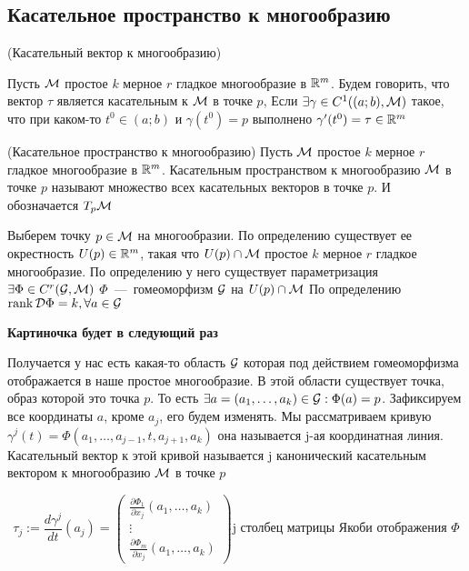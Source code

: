 
\subsection{Касательное пространство к многообразию}

\begin{definition} (Касательный вектор к многообразию)

Пусть $\mathcal{M}$ простое $k$ мерное $r$ гладкое многообразие в $\mathbb{R}^{m}$. Будем говорить, что вектор $\tau$ является касательным к $\mathcal{M}$ в точке $p$, Если $\exists \gamma \in C^{1} ((a;b), \mathcal{M})$ такое, что при каком-то $t^{0} \in (a; b)$ и $\gamma(t^{0}) = p$
выполнено $\gamma' (t^0) = \tau \in \mathbb{R}^m$ 


\end{definition}
    
    
\begin{definition} (Касательное пространство к многообразию)
    Пусть $\mathcal{M}$ простое $k$ мерное $r$ гладкое многообразие в $\mathbb{R}^{m}$. Касательным пространством к многообразию $\mathcal{M}$ в точке $p$ называют множество всех касательных векторов в точке $p$. И обозначается $T_{p} \mathcal{M}$
    
  
\end{definition}  
    
    

Выберем точку $p \in \mathcal{M}$ на многообразии. По определению существует ее окрестность $U(p) \in \mathbb{R}^{m}$, такая что $U(p) \cap \mathcal{M}$  простое $k$ мерное $r$ гладкое многообразие. По определению у него существует параметризация $\exists \Phi \in C^{r} (\mathcal{G}, \mathcal{M})$ $\Phi$~---~гомеоморфизм $\mathcal{G}$ на $U(p) \cap \mathcal{M}$ По определению $\operatorname{rank} \mathcal{D} \Phi = k, \forall a \in \mathcal{G}$


\textbf{Картиночка будет в следующий раз}

Получается у нас есть какая-то область $\mathcal{G}$ которая под действием гомеоморфизма отображается в наше простое многообразие. В этой области существует точка, образ которой это точка $p$. То есть 	$\exists a = (a_1, \dots , a_k) \in \mathcal{G}: \Phi(a) = p$.
Зафиксируем все координаты $a$, кроме $a_j$, его будем изменять. Мы рассматриваем кривую $\gamma^{j}(t) = \Phi (a_1, \dots, a_{j-1}, t, a_{j+1}, a_k)$ она называется j-ая координатная линия. Касательный вектор к этой кривой называется j канонический касательным вектором к многообразию $\mathcal{M}$ в точке $p$

    
\[
\tau_{j} := \frac{d\gamma^{j}}{d t} (a_{j}) =  
        \begin{pmatrix}
            \frac{\partial \Phi_1}{\partial x_j} (a_1, \dots, a_{k}) \\
            \vdots \\
            
            \frac{\partial \Phi_m}{\partial x_j} (a_1, \dots, a_{k})
        \end{pmatrix} \text{j столбец матрицы Якоби отображения } \Phi 
\]




